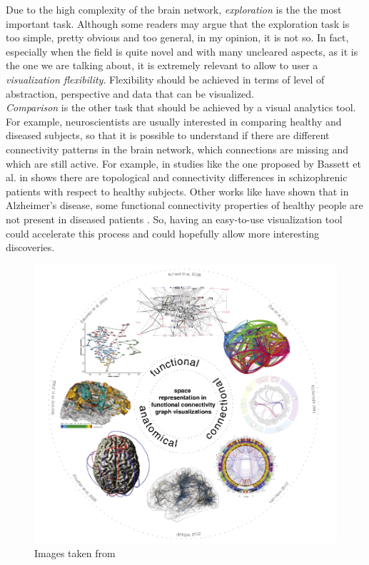 \documentclass{article}
\begin{document}
\begin{multicols}{2}
Due to the high complexity of the brain network, \textit{exploration} is the the most important task. Although some readers may argue that the exploration task is too simple, pretty obvious and too general, in my opinion, it is not so. In fact, especially when the field is quite novel and with many uncleared aspects, as it is the one we are talking about, it is extremely relevant to allow to user a \textit{visualization flexibility}. Flexibility should be achieved in terms of level of abstraction, perspective and data that can be visualized. \\

\textit{Comparison} is the other task that should be achieved by a visual analytics tool. For example, neuroscientists are usually interested in comparing healthy and diseased subjects, so that it is possible to understand if there are different connectivity patterns in the brain network, which connections are missing and which are still active. For example, in studies like the one proposed by Bassett et al. in \cite{hierarchicalOrganization} shows there are topological and connectivity differences in schizophrenic patients with respect to healthy subjects. Other works like \cite{alzheimer} have shown that in Alzheimer's disease, some functional connectivity properties of healthy people are not present in diseased patients . So, having an easy-to-use visualization tool could accelerate this process and could hopefully allow more interesting discoveries.

\begin{figure}[ht]
\centering
\includegraphics[width = 1.8\columnwidth]{taxonomy}
\caption{Images taken from \cite{visualizingHumanConnectome}}
\label{fig:taxonomy}
\end{figure}




\end{multicols}
\end{document}
